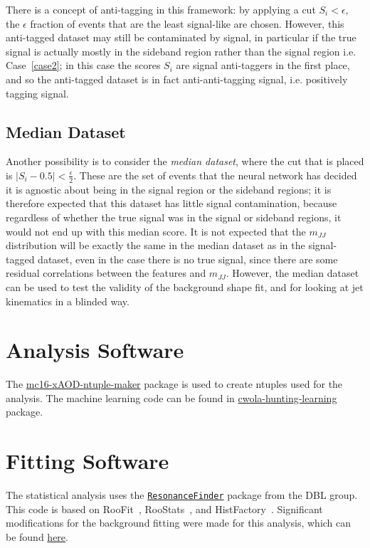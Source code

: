 There is a concept of anti-tagging in this framework: by applying a cut $S_i<\epsilon$, the $\epsilon$ fraction of events that are the least signal-like are chosen.
However, this anti-tagged dataset may still be contaminated by signal, in particular if the true signal is actually mostly in the sideband region rather than the signal region i.e. Case~\ref{case2}; in this case the scores $S_i$ are signal anti-taggers in the first place, and so the anti-tagged dataset is in fact anti-anti-tagging signal, i.e. positively tagging signal.

\subsection{Median Dataset}
Another possibility is to consider the \textit{median dataset}, where the cut that is placed is $|S_i-0.5|<\frac{\epsilon}{2}$.
These are the set of events that the neural network has decided it is agnostic about being in the signal region or the sideband regions; it is therefore expected that this dataset has little signal contamination, because regardless of whether the true signal was in the signal or sideband regions, it would not end up with this median score.
It is not expected that the $m_{JJ}$ distribution will be exactly the same in the median dataset as in the signal-tagged dataset, even in the case there is no true signal, since there are some residual correlations between the features and $m_{JJ}$.
However, the median dataset can be used to test the validity of the background shape fit, and for looking at jet kinematics in a blinded way.

\section{Analysis Software}
\label{app:CWoLa:software}

The \href{https://gitlab.cern.ch/acukierm/mc16-xAOD-ntuple-maker}{mc16-xAOD-ntuple-maker} package is used to create ntuples used for the analysis.
The machine learning code can be found in \href{https://gitlab.cern.ch/cwola-hunting/cwola-hunting-learning}{cwola-hunting-learning} package.

\section{Fitting Software}
\label{app:CWoLa:fitting_software}
The statistical analysis uses the \href{https://gitlab.cern.ch/atlas-phys/exot/dbl/ResonanceFinder}{\texttt{ResonanceFinder}} package from the DBL group.
This code is based on RooFit~\cite{Verkerke:2003ir}, RooStats~\cite{Moneta:2010pm}, and HistFactory~\cite{Cranmer:1456844}.
Significant modifications for the background fitting were made for this analysis, which can be found \href{https://gitlab.cern.ch/cwola-hunting/fitting/tree/minimal}{here}.


